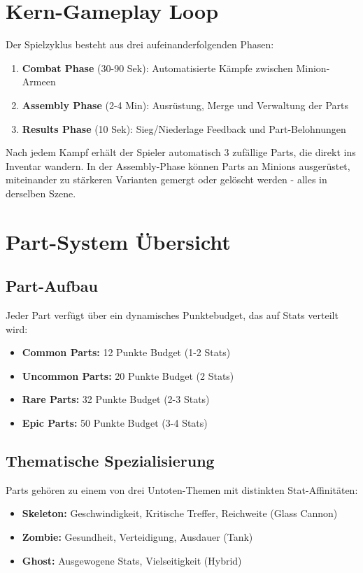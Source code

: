 \section{Kern-Gameplay Loop}

Der Spielzyklus besteht aus drei aufeinanderfolgenden Phasen:

\begin{enumerate}
    \item \textbf{Combat Phase} (30-90 Sek): Automatisierte Kämpfe zwischen Minion-Armeen
    \item \textbf{Assembly Phase} (2-4 Min): Ausrüstung, Merge und Verwaltung der Parts  
    \item \textbf{Results Phase} (10 Sek): Sieg/Niederlage Feedback und Part-Belohnungen
\end{enumerate}

Nach jedem Kampf erhält der Spieler automatisch 3 zufällige Parts, die direkt ins Inventar wandern. 
In der Assembly-Phase können Parts an Minions ausgerüstet, miteinander zu stärkeren Varianten 
gemergt oder gelöscht werden - alles in derselben Szene.

\section{Part-System Übersicht}

\subsection{Part-Aufbau}
Jeder Part verfügt über ein dynamisches Punktebudget, das auf Stats verteilt wird:

\begin{itemize}
    \item \textbf{Common Parts:} 12 Punkte Budget (1-2 Stats)
    \item \textbf{Uncommon Parts:} 20 Punkte Budget (2 Stats)
    \item \textbf{Rare Parts:} 32 Punkte Budget (2-3 Stats)
    \item \textbf{Epic Parts:} 50 Punkte Budget (3-4 Stats)
\end{itemize}

\subsection{Thematische Spezialisierung}
Parts gehören zu einem von drei Untoten-Themen mit distinkten Stat-Affinitäten:

\begin{itemize}
    \item \textbf{Skeleton:} Geschwindigkeit, Kritische Treffer, Reichweite (Glass Cannon)
    \item \textbf{Zombie:} Gesundheit, Verteidigung, Ausdauer (Tank)
    \item \textbf{Ghost:} Ausgewogene Stats, Vielseitigkeit (Hybrid)
\end{itemize}

